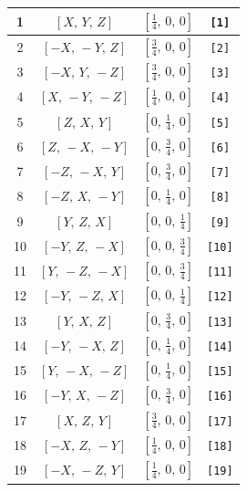 \documentclass[fleqn,8pt]{jsarticle}
\begin{document}
\begin{longtable}{cccc}
1 & $\left[ X,\, Y,\, Z \right]$ & $\left[ \frac{1}{4},\, 0,\, 0 \right]$ & {\tt [1]} \\ \hline
2 & $\left[ - X,\, - Y,\, Z \right]$ & $\left[ \frac{3}{4},\, 0,\, 0 \right]$ & {\tt [2]} \\ \hline
3 & $\left[ - X,\, Y,\, - Z \right]$ & $\left[ \frac{3}{4},\, 0,\, 0 \right]$ & {\tt [3]} \\ \hline
4 & $\left[ X,\, - Y,\, - Z \right]$ & $\left[ \frac{1}{4},\, 0,\, 0 \right]$ & {\tt [4]} \\ \hline
5 & $\left[ Z,\, X,\, Y \right]$ & $\left[ 0,\, \frac{1}{4},\, 0 \right]$ & {\tt [5]} \\ \hline
6 & $\left[ Z,\, - X,\, - Y \right]$ & $\left[ 0,\, \frac{3}{4},\, 0 \right]$ & {\tt [6]} \\ \hline
7 & $\left[ - Z,\, - X,\, Y \right]$ & $\left[ 0,\, \frac{3}{4},\, 0 \right]$ & {\tt [7]} \\ \hline
8 & $\left[ - Z,\, X,\, - Y \right]$ & $\left[ 0,\, \frac{1}{4},\, 0 \right]$ & {\tt [8]} \\ \hline
9 & $\left[ Y,\, Z,\, X \right]$ & $\left[ 0,\, 0,\, \frac{1}{4} \right]$ & {\tt [9]} \\ \hline
10 & $\left[ - Y,\, Z,\, - X \right]$ & $\left[ 0,\, 0,\, \frac{3}{4} \right]$ & {\tt [10]} \\ \hline
11 & $\left[ Y,\, - Z,\, - X \right]$ & $\left[ 0,\, 0,\, \frac{3}{4} \right]$ & {\tt [11]} \\ \hline
12 & $\left[ - Y,\, - Z,\, X \right]$ & $\left[ 0,\, 0,\, \frac{1}{4} \right]$ & {\tt [12]} \\ \hline
13 & $\left[ Y,\, X,\, Z \right]$ & $\left[ 0,\, \frac{3}{4},\, 0 \right]$ & {\tt [13]} \\ \hline
14 & $\left[ - Y,\, - X,\, Z \right]$ & $\left[ 0,\, \frac{1}{4},\, 0 \right]$ & {\tt [14]} \\ \hline
15 & $\left[ Y,\, - X,\, - Z \right]$ & $\left[ 0,\, \frac{1}{4},\, 0 \right]$ & {\tt [15]} \\ \hline
16 & $\left[ - Y,\, X,\, - Z \right]$ & $\left[ 0,\, \frac{3}{4},\, 0 \right]$ & {\tt [16]} \\ \hline
17 & $\left[ X,\, Z,\, Y \right]$ & $\left[ \frac{3}{4},\, 0,\, 0 \right]$ & {\tt [17]} \\ \hline
18 & $\left[ - X,\, Z,\, - Y \right]$ & $\left[ \frac{1}{4},\, 0,\, 0 \right]$ & {\tt [18]} \\ \hline
19 & $\left[ - X,\, - Z,\, Y \right]$ & $\left[ \frac{1}{4},\, 0,\, 0 \right]$ & {\tt [19]} \\ \hline

\end{longtable}
\end{document}
